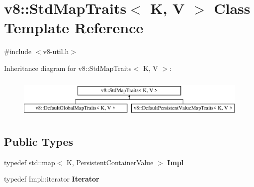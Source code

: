 \hypertarget{classv8_1_1_std_map_traits}{}\section{v8\+:\+:Std\+Map\+Traits$<$ K, V $>$ Class Template Reference}
\label{classv8_1_1_std_map_traits}


{\ttfamily \#include $<$v8-\/util.\+h$>$}

Inheritance diagram for v8\+:\+:Std\+Map\+Traits$<$ K, V $>$\+:\begin{figure}[H]
\begin{center}
\leavevmode
\includegraphics[height=2.000000cm]{classv8_1_1_std_map_traits}
\end{center}
\end{figure}
\subsection*{Public Types}
\begin{DoxyCompactItemize}
\item 
typedef std\+::map$<$ K, Persistent\+Container\+Value $>$ {\bfseries Impl}\hypertarget{classv8_1_1_std_map_traits_ac64cb78b3ef5cfbc35cf03837552e4ea}{}\label{classv8_1_1_std_map_traits_ac64cb78b3ef5cfbc35cf03837552e4ea}

\item 
typedef Impl\+::iterator {\bfseries Iterator}\hypertarget{classv8_1_1_std_map_traits_ad20ef2022e83bfba6dcee23a2a34098e}{}\label{classv8_1_1_std_map_traits_ad20ef2022e83bfba6dcee23a2a34098e}

\end{DoxyCompactItemize}
